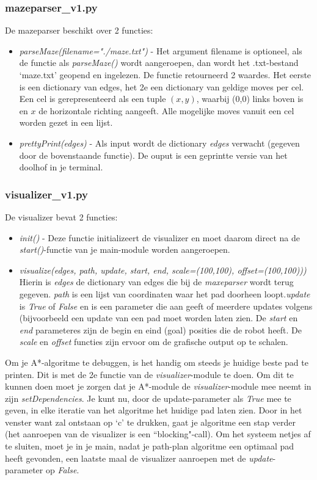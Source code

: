\documentclass[a4paper]{article}
\begin{document}
\subsubsection{mazeparser\_v1.py}
De mazeparser beschikt over 2 functies:
\begin{itemize}
\item \textit{parseMaze(filename="./maze.txt")} - Het argument filename is optioneel, als de functie als \textit{parseMaze()} wordt aangeroepen, dan wordt het .txt-bestand `maze.txt' geopend en ingelezen. De functie retourneerd 2 waardes. Het eerste is een dictionary van edges, het 2e een dictionary van geldige moves per cel. Een cel is gerepresenteerd als een tuple $(x,y)$, waarbij (0,0) links boven is en $x$ de horizontale richting aangeeft. Alle mogelijke moves vanuit een cel worden gezet in een lijst.
\item \textit{prettyPrint(edges)} - Als input wordt de dictionary \textit{edges} verwacht (gegeven door de bovenstaande functie). De ouput is een geprintte versie van het doolhof in je terminal.
\end{itemize}

\subsubsection{visualizer\_v1.py}
De visualizer bevat 2 functies: \\
\begin{itemize}
\item \textit{init()} - Deze functie initializeert de visualizer en moet daarom direct na de \textit{start()}-functie van je main-module worden aangeroepen.
\item \textit{visualize(edges, path, update, start, end, scale=(100,100), offset=(100,100)))}\\ Hierin is \textit{edges} de dictionary van edges die bij de \textit{maxeparser} wordt terug gegeven. \textit{path} is een lijst van coordinaten waar het pad doorheen loopt.\textit{update} is \textit{True} of \textit{False} en is een parameter die aan geeft of meerdere updates volgens (bijvoorbeeld een update van een pad moet worden laten zien. De \textit{start} en \textit{end} parameteres zijn de begin en eind (goal) posities die de robot heeft. De \textit{scale} en \textit{offset} functies zijn ervoor om de grafische output op te schalen.
\end{itemize}

Om je A*-algoritme te debuggen, is het handig om steeds je huidige beste pad te printen. Dit is met de 2e functie van de \textit{visualizer}-module te doen. Om dit te kunnen doen moet je zorgen dat je A*-module de \textit{visualizer}-module mee neemt in zijn \textit{setDependencies}. Je kunt nu, door de update-parameter als \textit{True} mee te geven, in elke iteratie van het algoritme het huidige pad laten zien. Door in het venster want zal ontstaan op `c' te drukken, gaat je algoritme een stap verder (het aanroepen van de visualizer is een ``blocking"-call). 
Om het systeem netjes af te sluiten, moet je in je main, nadat je path-plan algoritme een optimaal pad heeft gevonden, een laatste maal de visualizer aanroepen met de \textit{update}-parameter op \textit{False}.
\end{document}

